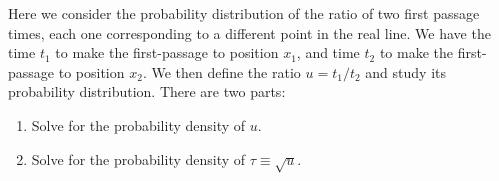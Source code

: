 

Here we consider the probability distribution of the ratio of two first passage times, each one corresponding to a different point in the real line.
We have the time $t_1$ to make the first-passage to position $x_1$, and time $t_2$ to make the first-passage to position $x_2$.
We then define the ratio $u = t_1 / t_2$ and study its probability distribution.
There are two parts:
\begin{enumerate}[\indent a.]
  \item Solve for the probability density of $u$.
  \item Solve for the probability density of $\tau \equiv \sqrt{u}$.
\end{enumerate}


